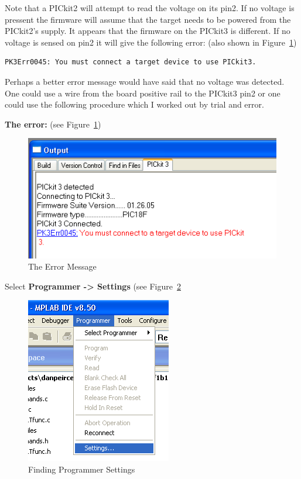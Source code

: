 \documentclass[twocolumn]{article}
\makeatletter
\def\maxwidth{\ifdim\Gin@nat@width>\linewidth\linewidth
\else\Gin@nat@width\fi}
\let\Oldincludegraphics\includegraphics
\renewcommand{\includegraphics}[1]{\Oldincludegraphics[width=\maxwidth]{#1}}
\makeatother
\begin{document}
Note that a PICkit2 will attempt to read the voltage on its pin2. If no
voltage is pressent the firmware will assume that the target needs to be
powered from the PICkit2's supply. It appears that the firmware on the
PICkit3 is different. If no voltage is sensed on pin2 it will give the
following error: (also shown in Figure~\ref{errormsg})

{\footnotesize
\begin{verbatim}
PK3Err0045: You must connect a target device to use PICkit3.
\end{verbatim}
}


Perhaps a better error message would have said that no voltage was
detected. One could use a wire from the board positive rail to the
PICkit3 pin2 or one could use the following procedure which I worked out
by trial and error.

\textbf{The error:} (see Figure~\ref{errormsg})

\begin{figure}[htbp]
\centering
\includegraphics{phys1600/error_on_connect.png}
\caption{The Error Message}
\label{errormsg}
\end{figure}

Select \textbf{Programmer -\textgreater{} Settings} (see Figure~\ref{programmersettings}

\begin{figure}[htbp]
\centering
\includegraphics{phys1600/programmer_settings.png}
\caption{Finding Programmer Settings}
\label{programmersettings}
\end{figure}
\end{document}
